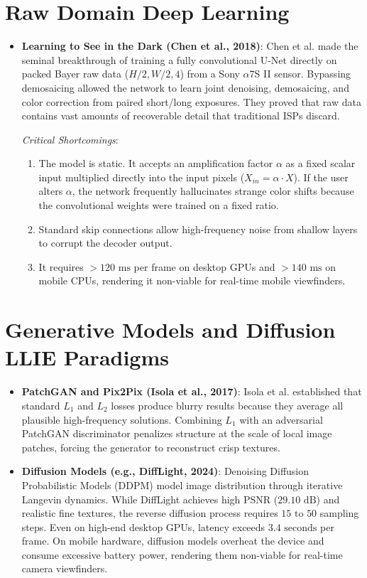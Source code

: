 \section{Raw Domain Deep Learning}
\begin{itemize}
    \item \textbf{Learning to See in the Dark (Chen et al., 2018)}:
    Chen et al. \cite{chen2018learning} made the seminal breakthrough of training a fully convolutional U-Net directly on packed Bayer raw data ($H/2, W/2, 4$) from a Sony $\alpha$7S II sensor. Bypassing demosaicing allowed the network to learn joint denoising, demosaicing, and color correction from paired short/long exposures. They proved that raw data contains vast amounts of recoverable detail that traditional ISPs discard.
    
    \textit{Critical Shortcomings}:
    \begin{enumerate}
        \item The model is static. It accepts an amplification factor $\alpha$ as a fixed scalar input multiplied directly into the input pixels ($X_{in} = \alpha \cdot X$). If the user alters $\alpha$, the network frequently hallucinates strange color shifts because the convolutional weights were trained on a fixed ratio.
        \item Standard skip connections allow high-frequency noise from shallow layers to corrupt the decoder output.
        \item It requires $> 120\text{ ms}$ per frame on desktop GPUs and $> 140\text{ ms}$ on mobile CPUs, rendering it non-viable for real-time mobile viewfinders.
    \end{enumerate}
\end{itemize}

\section{Generative Models and Diffusion LLIE Paradigms}
\begin{itemize}
    \item \textbf{PatchGAN and Pix2Pix (Isola et al., 2017)}:
    Isola et al. \cite{isola2017image} established that standard $L_1$ and $L_2$ losses produce blurry results because they average all plausible high-frequency solutions. Combining $L_1$ with an adversarial PatchGAN discriminator penalizes structure at the scale of local image patches, forcing the generator to reconstruct crisp textures.
    \item \textbf{Diffusion Models (e.g., DiffLight, 2024)}:
    Denoising Diffusion Probabilistic Models (DDPM) model image distribution through iterative Langevin dynamics. While DiffLight achieves high PSNR ($29.10\text{ dB}$) and realistic fine textures, the reverse diffusion process requires $15\text{ to }50$ sampling steps. Even on high-end desktop GPUs, latency exceeds $3.4\text{ seconds}$ per frame. On mobile hardware, diffusion models overheat the device and consume excessive battery power, rendering them non-viable for real-time camera viewfinders.
\end{itemize}

